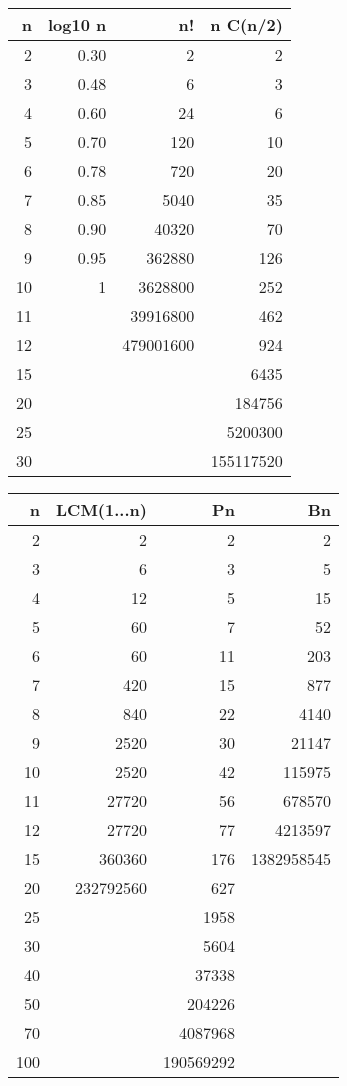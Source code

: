 \begin{small}
\begin{table}[H]
	\centering
	\begin{tabular}{|r|r|r|r|}
		\hline
		n & log10 n & n! & n C(n/2) \\
		\hline
		2 & 0.30 & 2 & 2 \\
		\hline
		3 & 0.48 & 6 & 3 \\
		\hline
		4 & 0.60 & 24 & 6 \\
		\hline
		5 & 0.70 & 120 & 10 \\
		\hline
		6 & 0.78 & 720 & 20 \\
		\hline
		7 & 0.85 & 5040 & 35 \\
		\hline
		8 & 0.90 & 40320 & 70 \\
		\hline
		9 & 0.95 & 362880 & 126 \\
		\hline
		10 & 1 & 3628800 & 252 \\
		\hline
		11 &  & 39916800 & 462 \\
		\hline
		12 &  & 479001600 & 924 \\
		\hline
		15 &  &  & 6435 \\
		\hline
		20 &  &  & 184756 \\
		\hline
		25 &  &  & 5200300 \\
		\hline
		30 &  &  & 155117520 \\
		\hline
		\end{tabular}
		\begin{tabular}{|r|r|r|r|}
			\hline
			n  & LCM(1...n)  & Pn  & Bn \\
			\hline
			2  & 2  & 2  & 2 \\
			\hline
			3  & 6  & 3  & 5 \\
			\hline
			4  & 12  & 5  & 15 \\
			\hline
			5  & 60  & 7  & 52 \\
			\hline
			6  & 60  & 11  & 203 \\
			\hline
			7  & 420  & 15  & 877 \\
			\hline
			8  & 840  & 22  & 4140 \\
			\hline
			9  & 2520  & 30  & 21147 \\
			\hline
			10  & 2520  & 42  & 115975 \\
			\hline
			11  & 27720  & 56  & 678570 \\
			\hline
			12  & 27720  & 77  & 4213597 \\
			\hline
			15  & 360360  & 176  & 1382958545 \\
			\hline
			20  & 232792560  & 627  &  \\
			\hline
			25  &   & 1958  &  \\
			\hline
			30  &   & 5604  &  \\
			\hline
			40  &   & 37338  &  \\
			\hline
			50  &   & 204226  &  \\
			\hline
			70  &   & 4087968  &  \\
			\hline
			100  &   & 190569292  &  \\
			\hline
		\end{tabular}
	\end{table}
\end{small}
